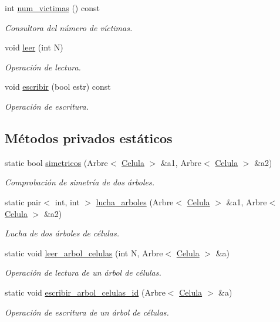 \begin{DoxyCompactItemize}
int \hyperlink{class_organismo_aadcc0750f9405e7334ac6a69e4ebb1b8}{num\+\_\+victimas} () const 
\begin{DoxyCompactList}\small\item\em Consultora del número de víctimas. \end{DoxyCompactList}\item 
void \hyperlink{class_organismo_a189d611401e25f603103c420d0b62e23}{leer} (int N)
\begin{DoxyCompactList}\small\item\em Operación de lectura. \end{DoxyCompactList}\item 
void \hyperlink{class_organismo_aaa66fa8430c7413c3960472961721b8b}{escribir} (bool estr) const 
\begin{DoxyCompactList}\small\item\em Operación de escritura. \end{DoxyCompactList}\end{DoxyCompactItemize}
\subsection*{Métodos privados estáticos}
\begin{DoxyCompactItemize}
\item 
static bool \hyperlink{class_organismo_ac483b268b68eed06f612ed690c22af8f}{simetricos} (Arbre$<$ \hyperlink{class_celula}{Celula} $>$ \&a1, Arbre$<$ \hyperlink{class_celula}{Celula} $>$ \&a2)
\begin{DoxyCompactList}\small\item\em Comprobación de simetría de dos árboles. \end{DoxyCompactList}\item 
static pair$<$ int, int $>$ \hyperlink{class_organismo_aaf643a47840f855ed3e105970f75a078}{lucha\+\_\+arboles} (Arbre$<$ \hyperlink{class_celula}{Celula} $>$ \&a1, Arbre$<$ \hyperlink{class_celula}{Celula} $>$ \&a2)
\begin{DoxyCompactList}\small\item\em Lucha de dos árboles de células. \end{DoxyCompactList}\item 
static void \hyperlink{class_organismo_abf016c166b00ca0f7016afd44d282913}{leer\+\_\+arbol\+\_\+celulas} (int N, Arbre$<$ \hyperlink{class_celula}{Celula} $>$ \&a)
\begin{DoxyCompactList}\small\item\em Operación de lectura de un árbol de células. \end{DoxyCompactList}\item 
static void \hyperlink{class_organismo_ad29f7f44a5694136d0a3990581426cf0}{escribir\+\_\+arbol\+\_\+celulas\+\_\+id} (Arbre$<$ \hyperlink{class_celula}{Celula} $>$ \&a)
\begin{DoxyCompactList}\small\item\em Operación de escritura de un árbol de células. \end{DoxyCompactList}\end{DoxyCompactItemize}
